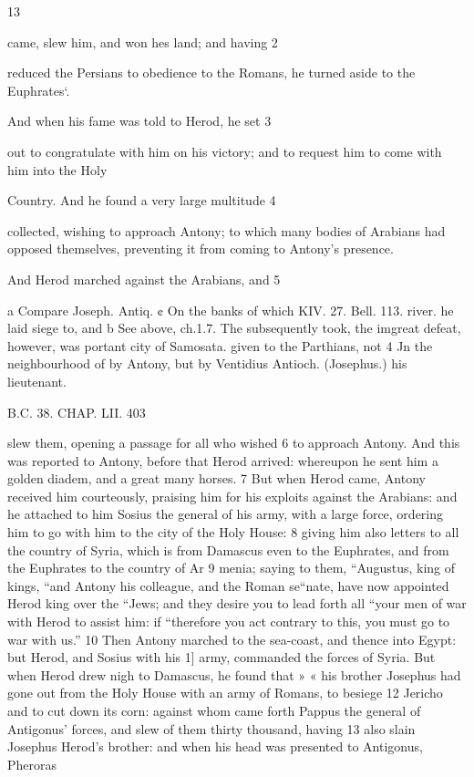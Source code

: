 13 

came, slew him, and won hes land; and having 2 

reduced the Persians to obedience to the Romans, he turned aside to the Euphrates‘. 

And when his fame was told to Herod, he set 3 

out to congratulate with him on his victory; and to request him to come with him into the Holy 

Country. And he found a very large multitude 4 

collected, wishing to approach Antony; to which many bodies of Arabians had opposed themselves, preventing it from coming to Antony’s presence. 

And Herod marched against the Arabians, and 5 

a Compare Joseph. Antiq. ¢ On the banks of which KIV. 27. Bell. 113. river. he laid siege to, and b See above, ch.1.7. The subsequently took, the imgreat defeat, however, was portant city of Samosata. given to the Parthians, not 4 Jn the neighbourhood of by Antony, but by Ventidius Antioch. (Josephus.) his lieutenant. 

B.C. 38. CHAP. LII. 403 

slew them, opening a passage for all who wished 
6 to approach Antony. And this was reported to Antony, before that Herod arrived: whereupon he sent him a golden diadem, and a great many horses. 
7 But when Herod came, Antony received him courteously, praising him for his exploits against the Arabians: and he attached to him Sosius the general of his army, with a large force, ordering him to go with him to the city of the Holy House: 
8 giving him also letters to all the country of Syria, which is from Damascus even to the Euphrates, and from the Euphrates to the country of Ar
9 menia; saying to them, “Augustus, king of kings, “and Antony his colleague, and the Roman se“nate, have now appointed Herod king over the “Jews; and they desire you to lead forth all “your men of war with Herod to assist him: if “therefore you act contrary to this, you must go to war with us.” 
10 Then Antony marched to the sea-coast, and thence into Egypt: but Herod, and Sosius with his 1] army, commanded the forces of Syria. But when Herod drew nigh to Damascus, he found that » « his brother Josephus had gone out from the Holy House with an army of Romans, to besiege 12 Jericho and to cut down its corn: against whom came forth Pappus the general of Antigonus’ forces, and slew of them thirty thousand, having 13 also slain Josephus Herod’s brother: and when his head was presented to Antigonus, Pheroras 

